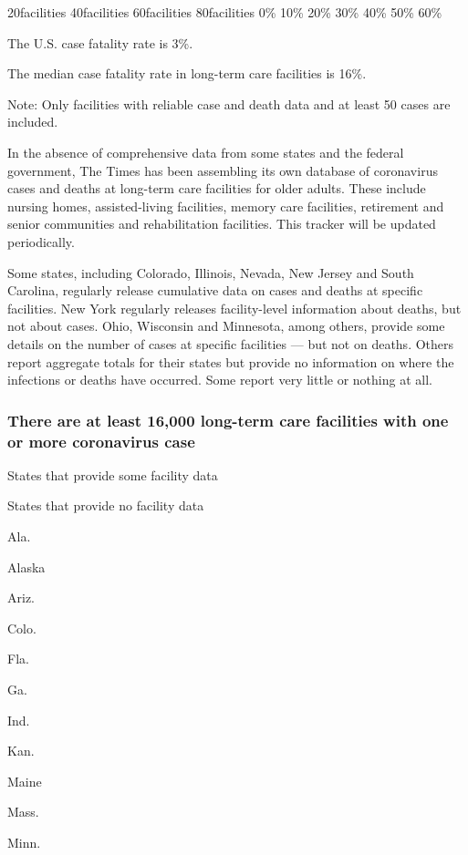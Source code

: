 20facilities 40facilities 60facilities 80facilities 0\% 10\% 20\% 30\%
40\% 50\% 60\%

The U.S. case fatality rate is 3\%.

The median case fatality rate in long-term care facilities is 16\%.

Note: Only facilities with reliable case and death data and at least 50
cases are included.

In the absence of comprehensive data from some states and the federal
government, The Times has been assembling its own database of
coronavirus cases and deaths at long-term care facilities for older
adults. These include nursing homes, assisted-living facilities, memory
care facilities, retirement and senior communities and rehabilitation
facilities. This tracker will be updated periodically.

Some states, including Colorado, Illinois, Nevada, New Jersey and South
Carolina, regularly release cumulative data on cases and deaths at
specific facilities. New York regularly releases facility-level
information about deaths, but not about cases. Ohio, Wisconsin and
Minnesota, among others, provide some details on the number of cases at
specific facilities --- but not on deaths. Others report aggregate
totals for their states but provide no information on where the
infections or deaths have occurred. Some report very little or nothing
at all.

\hypertarget{there-are-at-least-16000-long-term-care-facilities-with-one-or-more-coronavirus-case}{%
\subsubsection{There are at least 16,000 long-term care facilities with
one or more coronavirus
case}\label{there-are-at-least-16000-long-term-care-facilities-with-one-or-more-coronavirus-case}}

States that provide some facility data

States that provide no facility data

Ala.

Alaska

Ariz.

Colo.

Fla.

Ga.

Ind.

Kan.

Maine

Mass.

Minn.


